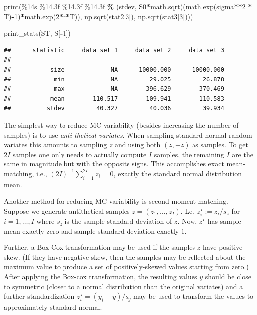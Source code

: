 \documentclass[
]{book}
\newenvironment{Shaded}{\begin{snugshade}}{\end{snugshade}}
\newcommand{\BuiltInTok}[1]{#1}
\newcommand{\DecValTok}[1]{\textcolor[rgb]{0.00,0.00,0.81}{#1}}
\newcommand{\NormalTok}[1]{#1}
\newcommand{\OperatorTok}[1]{\textcolor[rgb]{0.81,0.36,0.00}{\textbf{#1}}}
\newcommand{\SpecialCharTok}[1]{\textcolor[rgb]{0.00,0.00,0.00}{#1}}
\newcommand{\StringTok}[1]{\textcolor[rgb]{0.31,0.60,0.02}{#1}}
\begin{document}
\begin{Shaded}
\begin{Highlighting}[]
    \BuiltInTok{print}\NormalTok{(}\StringTok{\textquotesingle{}}\SpecialCharTok{\%14s}\StringTok{ }\SpecialCharTok{\%14.3f}\StringTok{ }\SpecialCharTok{\%14.3f}\StringTok{ }\SpecialCharTok{\%14.3f}\StringTok{\textquotesingle{}} \OperatorTok{\%}\NormalTok{ (}\StringTok{\textquotesingle{}stdev\textquotesingle{}}\NormalTok{, S0}\OperatorTok{*}\NormalTok{math.sqrt((math.exp(sigma}\OperatorTok{**}\DecValTok{2} \OperatorTok{*}\NormalTok{ T)}\OperatorTok{{-}}\DecValTok{1}\NormalTok{)}\OperatorTok{*}\NormalTok{math.exp(}\DecValTok{2}\OperatorTok{*}\NormalTok{r}\OperatorTok{*}\NormalTok{T)), np.sqrt(stat2[}\DecValTok{3}\NormalTok{]), np.sqrt(stat3[}\DecValTok{3}\NormalTok{])))}


\NormalTok{print\_stats(ST, S[}\OperatorTok{{-}}\DecValTok{1}\NormalTok{])}
\end{Highlighting}
\end{Shaded}

\begin{verbatim}
##      statistic     data set 1     data set 2     data set 3
## ---------------------------------------------
##           size             NA      10000.000      10000.000
##            min             NA         29.025         26.878
##            max             NA        396.629        370.469
##           mean        110.517        109.941        110.583
##          stdev         40.327         40.036         39.934
\end{verbatim}

The simplest way to reduce MC variability (besides increasing the number of samples) is to use \emph{anti-thetical variates}. When sampling standard normal random variates this amounts to sampling \(z\) and using both \((z,-z)\) as samples. To get \(2I\) samples one only needs to actually compute \(I\) samples, the remaining \(I\) are the same in magnitude but with the opposite signs. This accomplishes exact mean-matching, i.e., \((2I)^{-1}\sum_{i=1}^{2I} z_i = 0\), exactly the standard normal distribution mean.

Another method for reducing MC variability is second-moment matching. Suppose we generate antithetical samples \(z = (z_1, \ldots, z_I)\). Let \(z^\star_i := z_i / s_{z}\) for \(i=1, \ldots, I\) where \(s_z\) is the sample standard deviation of \(z\). Now, \(z^\star\) has sample mean exactly zero and sample standard deviation exactly \(1\).

Further, a Box-Cox transformation may be used if the samples \(z\) have positive skew. (If they have negative skew, then the samples may be reflected about the maximum value to produce a set of positively-skewed values starting from zero.) After applying the Box-cox transformation, the resulting values \(y\) should be close to symmetric (closer to a normal distribution than the original variates) and a further standardization \(z^\star_i = (y_i - \overline y)/s_y\) may be used to transform the values to approximately standard normal.
\end{document}
